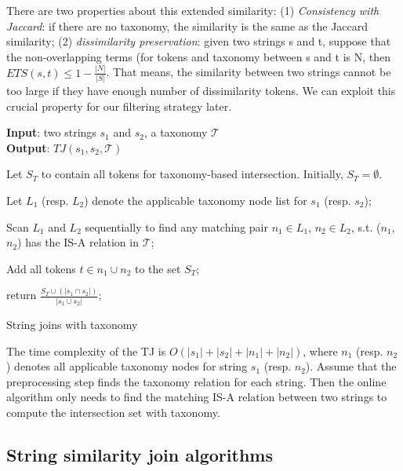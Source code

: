 There are two properties about this extended similarity: (1) \textit{Consistency with Jaccard}: if there are no taxonomy, the  similarity is the same as the Jaccard similarity; (2) \textit{dissimilarity preservation}: given two strings s and t, suppose that the non-overlapping terms (for tokens and taxonomy between s and t is N, then $ETS(s,t) \leq 1- \frac{|N|}{|S|}$. That means, the similarity between two strings cannot be too large if they have enough number of dissimilarity tokens. We can exploit this crucial property for our filtering strategy later.

\begin{algorithm}
{\bf Input}: two strings $s_1$ and $s_2$, a taxonomy $\mathcal{T}$ \\
{\bf Output}: $TJ(s_1,s_2,\mathcal{T})$
\begin{compactenum}[(1)]
\item Let $S_T $ to contain all tokens for taxonomy-based intersection. Initially, $S_T = \emptyset$.
\item Let $L_1$ (resp. $L_2$) denote the applicable taxonomy node list for $s_1$ (resp. $s_2$);
\item Scan $L_1$ and $L_2$ sequentially to find any matching pair $n_1 \in L_1$, $n_2 \in L_2$, s.t. ($n_1$,$n_2$) has the IS-A relation in $\mathcal{T}$;
\item Add all tokens $t \in n_1 \cup n_2$ to the set $S_T$;
\item  return $\frac{S_T \cup (|s_1 \cap s_2|)}{|s_1 \cup s_2|}$;
\end{compactenum}
\caption{String joins with taxonomy}
\label{alg:exactjoin}
\end{algorithm}

The time complexity of the TJ is $O(|s_1|+|s_2|+|n_1|+|n_2|)$, where $n_1$ (resp. $n_2$) denotes all applicable taxonomy nodes for string $s_1$  (resp. $n_2$). Assume that the preprocessing step finds the taxonomy relation for each string. Then the online algorithm only needs to find the matching IS-A relation between two strings to compute the intersection set with taxonomy.

\subsection{String similarity join algorithms}





